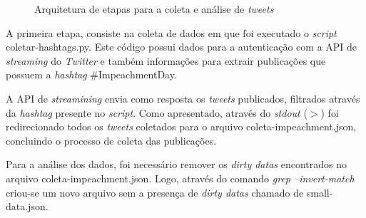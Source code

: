 \begin{figure}[h]
	\centering
	\vspace{0.1cm}
	\caption{Arquitetura de etapas para a coleta e análise de \textit{tweets}}
	\label{arquitetura}
\end{figure}

A primeira etapa, consiste na coleta de dados em que foi executado o \textit{script} coletar-hashtags.py. Este código possui dados para a autenticação com a API de \textit{streaming} do \textit{Twitter} e também informações para extrair publicações que possuem a \textit{hashtag} \#ImpeachmentDay.

A API de \textit{streamining} envia como resposta os \textit{tweets} publicados, filtrados através da \textit{hashtag} presente no \textit{script}. Como apresentado, através do \textit{stdout} ($>$) foi redirecionado todos os \textit{tweets} coletados para o arquivo coleta-impeachment.json, concluindo o processo de coleta das publicações.

Para a análise dos dados, foi necessário remover os \textit{dirty datas} encontrados no arquivo coleta-impeachment.json. Logo, através do comando \textit{grep --invert-match} criou-se um novo arquivo sem a presença de \textit{dirty datas} chamado de small-data.json.


